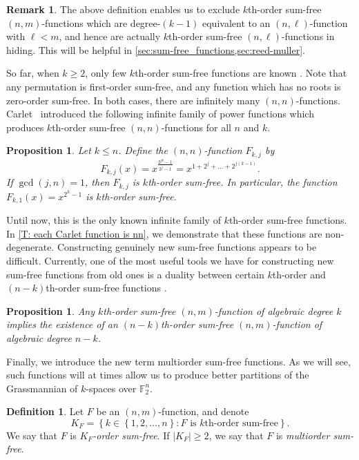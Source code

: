 \documentclass[12pt]{article}
\newtheorem{prop}[thm]{Proposition}
\theoremstyle{definition}
\newtheorem{defn}[thm]{Definition}
\newtheorem*{remark}{Remark}
\newcommand{\F}{\mathbb F}
\newcommand{\set}[1]{\left\{#1\right\}}
\begin{document}
\begin{remark}
    The above definition enables us to exclude $k$th-order sum-free $(n, m)$-functions which are degree-$(k-1)$ equivalent to an $(n, \ell)$-function with $\ell < m$, and hence are actually  $k$th-order sum-free $(n,\ell)$-functions in hiding. This will be helpful in \cref{sec:sum-free_functions,sec:reed-muller}.
\end{remark}

So far, when $k\ge 2$, only few $k$th-order sum-free functions are known \cite{carlet2025tDegree,carlet2025generalizations,kaspers2026WCC}. Note that any permutation is first-order sum-free, and any function which has no roots is zero-order sum-free. In both cases, there are infinitely many $(n, n)$-functions. Carlet~\cite{carlet2025tDegree,carlet2025generalizations} introduced the following infinite family of power functions which produces $k$th-order sum-free $(n,n)$-functions for all $n$ and $k$. 

\begin{prop}
\label{prop:Carlet_kth-order}
	Let $k\le n$. Define the $(n,n)$-function $F_{k,j}$ by
	\[
		F_{k,j}(x) = x^\frac{2^{jk}-1}{2^j-1} = x^{1+2^j+\dots+2^{j(k-1)}}.
	\]
	If $\gcd(j,n) = 1$, then $F_{k,j}$ is $k$th-order sum-free. In particular, the function $F_{k,1}(x) = x^{2^k-1}$ is $k$th-order sum-free.
\end{prop}

Until now, this is the only known infinite family of $k$th-order sum-free functions. In \cref{T: each Carlet function is nn}, we demonstrate that these functions are non-degenerate. Constructing genuinely new sum-free functions appears to be difficult. Currently, one of the most useful tools we have for constructing new sum-free functions from old ones is a duality between certain $k$th-order and $(n-k)$th-order sum-free functions \cite[Theorem~5.12]{kaspers2026WCC}.

\begin{prop}
\label{P: k gives n-k}
    Any $k$th-order sum-free $(n,m)$-function of algebraic degree $k$ implies the existence of an $(n-k)$th-order sum-free $(n,m)$-function of algebraic degree $n-k$.
\end{prop}


 Finally, we introduce the new term multiorder sum-free functions. As we will see, such functions will at times allow us to produce better partitions of the Grassmannian of $k$-spaces over $\F_2^{n}$.
\begin{defn}
\label{def:multiorder-sum-free}
	Let $F$ be an $(n,m)$-function, and denote
	\[
		K_F = \set{k \in \set{1, 2,\dots,n} : \text{$F$ is $k$th-order sum-free}}.
	\]
	We say that $F$ is \emph{$K_F$-order sum-free}. If $|K_F| \ge 2$, we say that $F$ is \emph{multiorder sum-free}.
\end{defn}
	
\end{document}
